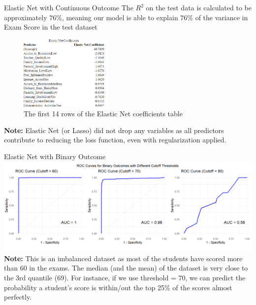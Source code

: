 \documentclass[
  ignorenonframetext,
]{beamer}
\begin{document}
\begin{frame}{Elastic Net with Continuous Outcome}
\label{elastic-net-with-continuous-outcome}
The \(R^2\) on the test data is calculated to be approximately \(76\%\),
meaning our model is able to explain \(76\%\) of the variance in Exam
Score in the test dataset

\begin{figure}[H]

{\centering \includegraphics[width=0.4\textwidth,height=\textheight]{elastnettable1.png}

}

\caption{The first 14 rows of the Elastic Net coefficients table}

\end{figure}%

\textbf{Note:} Elastic Net (or Lasso) did not drop any variables as all
predictors contribute to reducing the loss function, even with
regularization applied.
\end{frame}

\begin{frame}{Elastic Net with Binary Outcome}
\label{elastic-net-with-binary-outcome}
\includegraphics[width=1\textwidth,height=\textheight]{ROC_3plots.png}
\textbf{Note:} This is an imbalanced dataset as most of the students
have scored more than 60 in the exams. The median (and the mean) of the
dataset is very close to the 3rd quantile (69). For instance, if we use
threshold = 70, we can predict the probability a student's score is
within/out the top 25\% of the scores almost perfectly.
\end{frame}
\end{document}
